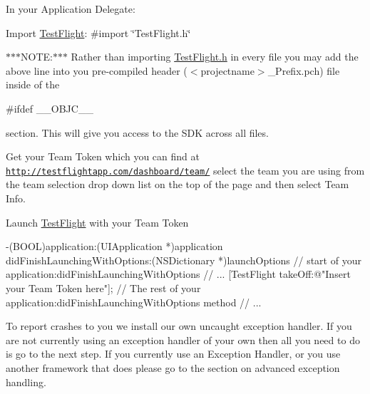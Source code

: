 \begin{DoxyEnumerate}
\item In your Application Delegate\-:
\begin{DoxyEnumerate}
\item Import \hyperlink{interface_test_flight}{Test\-Flight}\-: {\ttfamily \#import \char`\"{}\-Test\-Flight.\-h\char`\"{}}

$\ast$$\ast$$\ast$\-N\-O\-T\-E\-:$\ast$$\ast$$\ast$ Rather than importing {\ttfamily \hyperlink{_test_flight_8h}{Test\-Flight.\-h}} in every file you may add the above line into you pre-\/compiled header ({\ttfamily $<$projectname$>$\-\_\-\-Prefix.\-pch}) file inside of the \begin{DoxyVerb}#ifdef __OBJC__ 
\end{DoxyVerb}


section. This will give you access to the S\-D\-K across all files.
\end{DoxyEnumerate}


\begin{DoxyEnumerate}
\item Get your Team Token which you can find at \href{http://testflightapp.com/dashboard/team/}{\tt http\-://testflightapp.\-com/dashboard/team/} select the team you are using from the team selection drop down list on the top of the page and then select Team Info.
\end{DoxyEnumerate}


\begin{DoxyEnumerate}
\item Launch \hyperlink{interface_test_flight}{Test\-Flight} with your Team Token \begin{DoxyVerb} -(BOOL)application:(UIApplication *)application 
     didFinishLaunchingWithOptions:(NSDictionary *)launchOptions {
 // start of your application:didFinishLaunchingWithOptions 
 // ...
 [TestFlight takeOff:@"Insert your Team Token here"];
 // The rest of your application:didFinishLaunchingWithOptions method
 // ...
 }
\end{DoxyVerb}

\end{DoxyEnumerate}


\begin{DoxyEnumerate}
\item To report crashes to you we install our own uncaught exception handler. If you are not currently using an exception handler of your own then all you need to do is go to the next step. If you currently use an Exception Handler, or you use another framework that does please go to the section on advanced exception handling.
\end{DoxyEnumerate}
\end{DoxyEnumerate}


